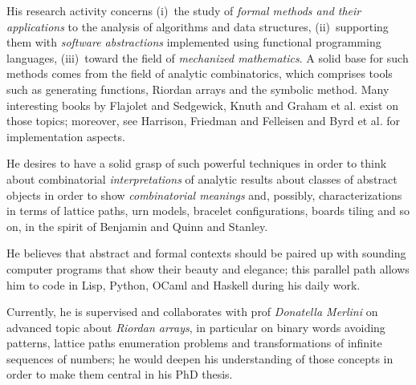 \documentclass[a4paper]{tufte-handout}
\begin{document}
    His research activity concerns (i)~the study of \textit{formal methods
    and their applications} to the analysis of algorithms and data structures,
    (ii)~supporting them with \textit{software abstractions} implemented using functional
    programming languages, (iii)~toward the field of \textit{mechanized mathematics}.  
    A solid base for such methods comes from the field
    of analytic combinatorics, which comprises tools such as generating
    functions, Riordan arrays and the symbolic method. Many interesting books
    by Flajolet and Sedgewick,
    Knuth and Graham et al.  exist on those topics; moreover,  see
    Harrison, Friedman and Felleisen
     and
    Byrd et al. for implementation aspects. 


    He desires to have a solid grasp of such powerful techniques in order to
    think about combinatorial \emph{interpretations} of
    analytic results about classes of abstract objects in order to show
    \emph{combinatorial meanings} and, possibly, characterizations in terms
    of lattice paths, urn models, bracelet configurations, boards
    tiling and so on, in the spirit of Benjamin and Quinn  and Stanley.

    He believes that abstract and formal contexts should be paired up with
    sounding computer programs that show their beauty and elegance; this
    parallel path allows him to code in Lisp, Python, OCaml and Haskell during
    his daily work.

    Currently, he is supervised and collaborates with prof \textit{Donatella
    Merlini} on advanced topic about \textit{Riordan arrays}, in particular on
    binary words avoiding patterns, lattice paths enumeration problems and
    transformations of infinite sequences of numbers; he would deepen his
    understanding of those concepts in order to make them central in his PhD
    thesis. 
\end{document}
